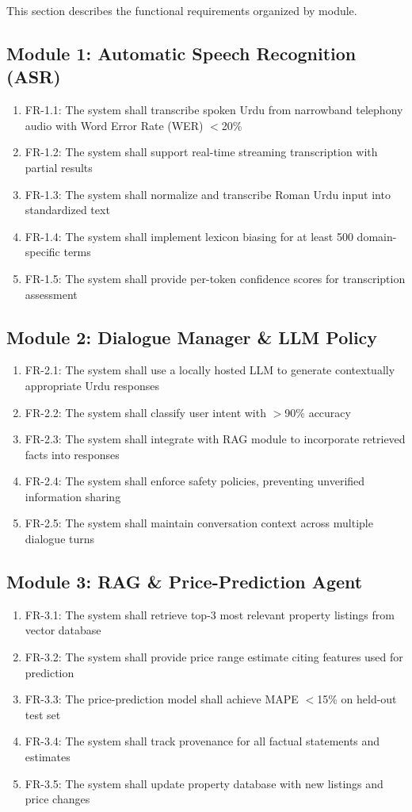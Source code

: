 This section describes the functional requirements organized by module.

\subsection{Module 1: Automatic Speech Recognition (ASR)}
\begin{enumerate}
    \item FR-1.1: The system shall transcribe spoken Urdu from narrowband telephony audio with Word Error Rate (WER) $<$20\%
    \item FR-1.2: The system shall support real-time streaming transcription with partial results
    \item FR-1.3: The system shall normalize and transcribe Roman Urdu input into standardized text
    \item FR-1.4: The system shall implement lexicon biasing for at least 500 domain-specific terms
    \item FR-1.5: The system shall provide per-token confidence scores for transcription assessment
\end{enumerate}

\subsection{Module 2: Dialogue Manager \& LLM Policy}
\begin{enumerate}
    \item FR-2.1: The system shall use a locally hosted LLM to generate contextually appropriate Urdu responses
    \item FR-2.2: The system shall classify user intent with $>$90\% accuracy
    \item FR-2.3: The system shall integrate with RAG module to incorporate retrieved facts into responses
    \item FR-2.4: The system shall enforce safety policies, preventing unverified information sharing
    \item FR-2.5: The system shall maintain conversation context across multiple dialogue turns
\end{enumerate}

\subsection{Module 3: RAG \& Price-Prediction Agent}
\begin{enumerate}
    \item FR-3.1: The system shall retrieve top-3 most relevant property listings from vector database
    \item FR-3.2: The system shall provide price range estimate citing features used for prediction
    \item FR-3.3: The price-prediction model shall achieve MAPE $<$15\% on held-out test set
    \item FR-3.4: The system shall track provenance for all factual statements and estimates
    \item FR-3.5: The system shall update property database with new listings and price changes
\end{enumerate}

